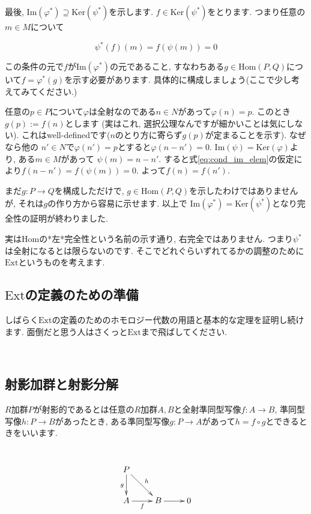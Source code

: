 \documentclass{jsarticle}
\def\Im{\mathrm{Im}}
\def\Ker{\mathrm{Ker}}
\def\Hom{\mathrm{Hom}}
\def\Ext{\mathrm{Ext}}
\theoremstyle{definition}
\numberwithin{theorem}{section}
\begin{document}
最後, $\Im(\varphi^*)\supseteq \Ker(\psi^*)$を示します. $f\in\Ker(\psi^*)$をとります. つまり任意の$m\in M$について

\begin{equation}
\label{eq:cond_im_elem}
\psi^*(f)(m) = f(\psi(m)) = 0
\end{equation}

この条件の元で$f$が$\Im(\varphi^*)$の元であること, すなわちある$g\in\Hom(P, Q)$について$f = \varphi^*(g)$を示す必要があります. 具体的に構成しましょう(ここで少し考えてみてください.)

任意の$p\in P$について$\varphi$は全射なのである$n\in N$があって$\varphi(n) = p$. このとき$g(p) := f(n)$とします
(実はこれ, 選択公理なんですが細かいことは気にしない). これはwell-definedです($n$のとり方に寄らず$g(p)$が定まることを示す). なぜなら他の
$n'\in N$で$\varphi(n') = p$とすると$\varphi(n-n') = 0$. $\Im(\psi) = \Ker(\varphi)$より, ある$m\in M$があって
$\psi(m) = n-n'$. すると式\ref{eq:cond_im_elem}の仮定により$f(n-n') = f(\psi(m)) = 0$. よって$f(n) = f(n')$.

まだ$g: P\rightarrow Q$を構成しただけで, $g\in\Hom(P, Q)$を示したわけではありませんが, それは$g$の作り方から容易に示せます. 以上で
$\Im(\varphi^*) = \Ker(\psi^*)$となり完全性の証明が終わりました. 

実は$\Hom$の*左*完全性という名前の示す通り, 右完全ではありません. つまり$\psi^*$は全射になるとは限らないのです. そこでどれぐらいずれてるかの調整のために$\Ext$というものを考えます.

\subsection{$\Ext$の定義のための準備}
しばらく$\Ext$の定義のためのホモロジー代数の用語と基本的な定理を証明し続けます. 面倒だと思う人はさくっと$\Ext$まで飛ばしてください.

\hrulefill\\

\subsection{射影加群と射影分解}
\label{sc:proj_module}
$R$加群$P$が射影的であるとは任意の$R$加群$A, B$と全射準同型写像$f: A\rightarrow B$, 準同型写像$h: P\rightarrow B$があったとき, 
ある準同型写像$g: P\rightarrow A$があって$h = f\circ g$とできるときをいいます.

\hrulefill\\

\begin{equation*}
\xymatrix{
  P \ar[dr]^h \ar[d]_g & \\
  A \ar[r]_f & B \ar[r] & 0
}
\end{equation*}
\end{document}
